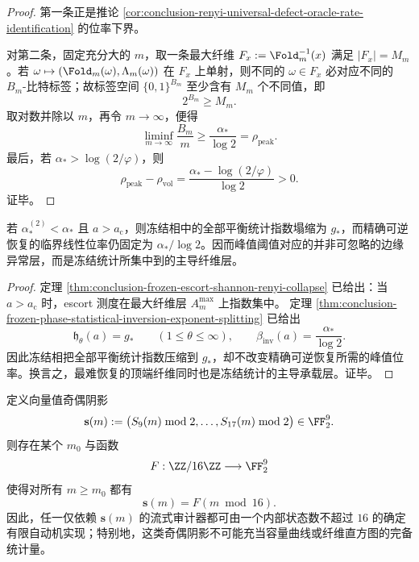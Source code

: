 \begin{proof}
第一条正是推论 \ref{cor:conclusion-renyi-universal-defect-oracle-rate-identification} 的位率下界。

对第二条，固定充分大的 \(m\)，取一条最大纤维 \(F_x:=\Fold_m^{-1}(x)\) 满足 \(|F_x|=M_m\)。若 \(\omega\mapsto(\Fold_m(\omega),\Lambda_m(\omega))\) 在 \(F_x\) 上单射，则不同的 \(\omega\in F_x\) 必对应不同的 \(B_m\)-比特标签；故标签空间 \(\{0,1\}^{B_m}\) 至少含有 \(M_m\) 个不同值，即
\[
2^{B_m}\ge M_m.
\]
取对数并除以 \(m\)，再令 \(m\to\infty\)，便得
\[
\liminf_{m\to\infty}\frac{B_m}{m}\ge \frac{\alpha_\ast}{\log 2}=\rho_{\mathrm{peak}}.
\]
最后，若 \(\alpha_\ast>\log(2/\varphi)\)，则
\[
\rho_{\mathrm{peak}}-\rho_{\mathrm{vol}}
=
\frac{\alpha_\ast-\log(2/\varphi)}{\log 2}>0.
\]
证毕。
\end{proof}

\begin{corollary}[冻结相中主导障碍的峰值定位]\label{cor:conclusion-frozen-phase-peak-obstruction-localization}
若 \(\alpha_\ast^{(2)}<\alpha_\ast\) 且 \(a>a_{\mathrm c}\)，则冻结相中的全部平衡统计指数塌缩为 \(g_\ast\)，而精确可逆恢复的临界线性位率仍固定为 \(\alpha_\ast/\log 2\)。因而峰值阈值对应的并非可忽略的边缘异常层，而是冻结统计所集中到的主导纤维层。
\end{corollary}

\begin{proof}
定理 \ref{thm:conclusion-frozen-escort-shannon-renyi-collapse} 已给出：当 \(a>a_{\mathrm c}\) 时，escort 测度在最大纤维层 \(A_m^{\max}\) 上指数集中。
定理 \ref{thm:conclusion-frozen-phase-statistical-inversion-exponent-splitting} 已给出
\[
\mathfrak h_\theta(a)=g_\ast
\qquad (1\le \theta\le \infty),
\qquad
\beta_{\mathrm{inv}}(a)=\frac{\alpha_\ast}{\log 2}.
\]
因此冻结相把全部平衡统计指数压缩到 \(g_\ast\)，却不改变精确可逆恢复所需的峰值位率。换言之，最难恢复的顶端纤维同时也是冻结统计的主导承载层。证毕。
\end{proof}

\begin{proposition}[共振窗奇偶阴影的常数内存塌缩]\label{prop:conclusion-parity-shadow-constant-memory-collapse}
定义向量值奇偶阴影
\[
\mathbf s(m)
:=
\bigl(S_9(m)\bmod 2,\dots,S_{17}(m)\bmod 2\bigr)\in \FF_2^9.
\]
则存在某个 \(m_0\) 与函数
\[
F:\ZZ/16\ZZ\longrightarrow \FF_2^9
\]
使得对所有 \(m\ge m_0\) 都有
\[
\mathbf s(m)=F(m\bmod 16).
\]
因此，任一仅依赖 \(\mathbf s(m)\) 的流式审计器都可由一个内部状态数不超过 \(16\) 的确定有限自动机实现；特别地，这类奇偶阴影不可能充当容量曲线或纤维直方图的完备统计量。
\end{proposition}

